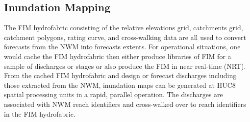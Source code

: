\subsection{Inundation Mapping}
\label{ssec:inundation_mapping}
%
The FIM hydrofabric consisting of the relative elevations grid, catchments grid, catchment polygons, rating curve, and cross-walking data are all used to convert forecasts from the NWM into forecasts extents.
For operational situations, one would cache the FIM hydrofabric then either produce libraries of FIM for a sample of discharges or stages or also produce the FIM in near real-time (NRT).
From the cached FIM hydrofabric and design or forecast discharges including those extracted from the NWM, inundation maps can be generated at HUC8 spatial processing units in a rapid, parallel operation. 
The discharges are associated with NWM reach identifiers and cross-walked over to reach identifiers in the FIM hydrofabric.



